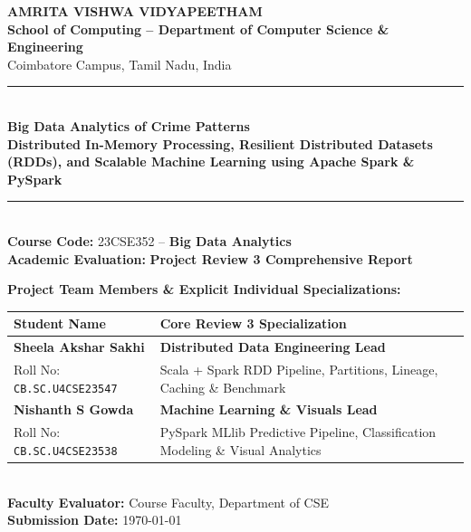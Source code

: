 \documentclass[11pt,a4paper]{article}
\begin{document}
\begin{titlepage}
    \centering
    \vspace*{0.5cm}
    
    {\huge \bfseries \textcolor{AmritaMaroon}{AMRITA VISHWA VIDYAPEETHAM}}\\[0.25cm]
    {\large \textbf{School of Computing -- Department of Computer Science \& Engineering}}\\[0.15cm]
    {\normalsize Coimbatore Campus, Tamil Nadu, India}\\[1.2cm]

    \rule{\textwidth}{1.5pt}\\[0.4cm]
    {\LARGE \bfseries \textcolor{NavyBlue}{Big Data Analytics of Crime Patterns}}\\[0.3cm]
    {\Large \bfseries Distributed In-Memory Processing, Resilient Distributed Datasets (RDDs), and Scalable Machine Learning using Apache Spark \& PySpark}\\[0.2cm]
    \rule{\textwidth}{1.5pt}\\[0.8cm]

    {\large \textbf{Course Code:} \textcolor{AmritaMaroon}{23CSE352} -- \textbf{Big Data Analytics}}\\[0.2cm]
    {\large \textbf{Academic Evaluation:} \textbf{Project Review 3 Comprehensive Report}}\\[1.5cm]

    \begin{minipage}{0.9\textwidth}
        \centering
        \textbf{\large Project Team Members \& Explicit Individual Specializations:}\\[0.6cm]
        \begin{tabular}{p{6.8cm}p{6.8cm}}
            \toprule
            \textbf{Student Name} & \textbf{Core Review 3 Specialization} \\
            \midrule
            \textbf{Sheela Akshar Sakhi} & \textbf{Distributed Data Engineering Lead} \\
            Roll No: \texttt{CB.SC.U4CSE23547} & Scala + Spark RDD Pipeline, Partitions, Lineage, Caching \& Benchmark \\[0.4cm]
            \textbf{Nishanth S Gowda} & \textbf{Machine Learning \& Visuals Lead} \\
            Roll No: \texttt{CB.SC.U4CSE23538} & PySpark MLlib Predictive Pipeline, Classification Modeling \& Visual Analytics \\
            \bottomrule
        \end{tabular}
    \end{minipage}\\[1.8cm]

    \vfill
    {\normalsize \textbf{Faculty Evaluator:} Course Faculty, Department of CSE}\\[0.2cm]
    {\normalsize \textbf{Submission Date:} \today}
\end{titlepage}
\end{document}
